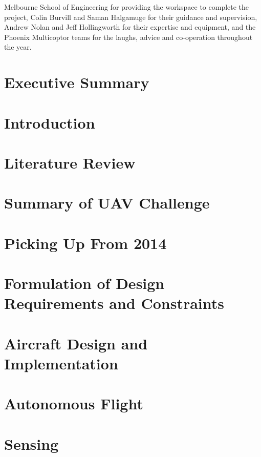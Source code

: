 \documentclass[]{article}
\begin{document}
Melbourne School of Engineering for providing the workspace to complete the project, Colin Burvill and Saman Halgamuge for their guidance and supervision, Andrew Nolan and Jeff Hollingworth for their expertise and equipment, and the Phoenix Multicoptor teams for the laughs, advice and co-operation throughout the year.



\newpage
\section{Executive Summary}


\section{Introduction}


\section{Literature Review}


\section{Summary of UAV Challenge}


\section{Picking Up From 2014}


\section{Formulation of Design Requirements and Constraints}


\section{Aircraft Design and Implementation}


\section{Autonomous Flight}


\section{Sensing}

\end{document}
